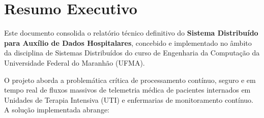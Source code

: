 \documentclass[12pt,a4paper]{article}
\begin{document}
\newpage
\tableofcontents
\newpage

\section*{Resumo Executivo}

Este documento consolida o relatório técnico definitivo do \textbf{Sistema Distribuído para Auxílio de Dados Hospitalares}, concebido e implementado no âmbito da disciplina de Sistemas Distribuídos do curso de Engenharia da Computação da Universidade Federal do Maranhão (UFMA).

O projeto aborda a problemática crítica de processamento contínuo, seguro e em tempo real de fluxos massivos de telemetria médica de pacientes internados em Unidades de Terapia Intensiva (UTI) e enfermarias de monitoramento contínuo. A solução implementada abrange:
\end{document}
